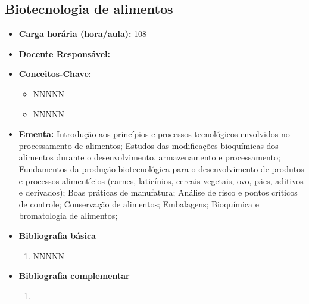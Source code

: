 \documentclass[11pt,fleqn]{book} %
\begin{document}
\subsection{Biotecnologia de alimentos}\label{disc:biotecAlimentos}
\begin{itemize}
	\item \textbf{Carga horária (hora/aula):} 108
	\item \textbf{Docente Responsável:}
	\item \textbf{Conceitos-Chave:}
	\begin{itemize}
		\item NNNNN
		\item NNNNN
	\end{itemize}
	\item \textbf{Ementa:} Introdução aos princípios e processos tecnológicos envolvidos no processamento de alimentos;
	Estudos das modificações bioquímicas dos alimentos durante o desenvolvimento, armazenamento e processamento;
	Fundamentos da produção biotecnológica para o desenvolvimento de produtos e processos alimentícios (carnes, laticínios, cereais vegetais, ovo, pães, aditivos e derivados);
	Boas práticas de manufatura;
	Análise de risco e pontos críticos de controle;
	Conservação de alimentos;
	Embalagens;
	Bioquímica e bromatologia de alimentos;
	\item \textbf{Bibliografia básica}
	\begin{enumerate}
		\item NNNNN
	\end{enumerate}
	\item \textbf{Bibliografia complementar}
	\begin{enumerate}
		\item 
	\end{enumerate}	
\end{itemize}


\newpage
\end{document}
